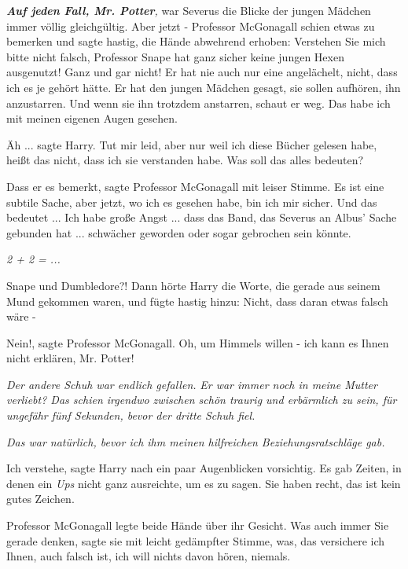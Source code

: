 \glqq{}\textbf{\emph{Auf jeden Fall, Mr. Potter}}\emph{,} war Severus die Blicke
der jungen Mädchen immer völlig gleichgültig. Aber jetzt -\grqq{} Professor
McGonagall schien etwas zu bemerken und sagte hastig, die Hände abwehrend
erhoben: \glqq{}Verstehen Sie mich bitte nicht falsch, Professor Snape hat ganz
sicher keine jungen Hexen ausgenutzt! Ganz und gar nicht! Er hat nie auch nur
eine angelächelt, nicht, dass ich es je gehört hätte. Er hat den jungen Mädchen
gesagt, sie sollen aufhören, ihn anzustarren. Und wenn sie ihn trotzdem
anstarren, schaut er weg. Das habe ich mit meinen eigenen Augen gesehen.\grqq{}

\glqq{}Äh ...\grqq{} sagte Harry. \glqq{}Tut mir leid, aber nur weil ich diese
Bücher gelesen habe, heißt das nicht, dass ich sie verstanden habe. Was soll das
alles bedeuten?\grqq{}

\glqq{}Dass er es bemerkt\grqq{}, sagte Professor McGonagall mit leiser Stimme.
\glqq{}Es ist eine subtile Sache, aber jetzt, wo ich es gesehen habe, bin ich mir
sicher. Und das bedeutet ... Ich habe große Angst ... dass das Band, das Severus
an Albus' Sache gebunden hat ... schwächer geworden oder sogar gebrochen sein
könnte.\grqq{}

\emph{2 + 2 = ...}

\glqq{}Snape und Dumbledore?!\grqq{} Dann hörte Harry die Worte, die gerade aus
seinem Mund gekommen waren, und fügte hastig hinzu: \glqq{}Nicht, dass daran
etwas falsch wäre -\grqq{}

\glqq{}Nein!\grqq{}, sagte Professor McGonagall. \glqq{}Oh, um Himmels willen -
ich kann es Ihnen nicht erklären, Mr. Potter!\grqq{}

\emph{Der andere Schuh war endlich gefallen.}
\emph{Er war immer noch in meine Mutter verliebt? Das schien irgendwo zwischen
schön traurig und erbärmlich zu sein, für ungefähr fünf Sekunden, bevor der
dritte Schuh fiel.}

\emph{Das war natürlich, bevor ich ihm meinen hilfreichen Beziehungsratschläge
gab.}

\glqq{}Ich verstehe\grqq{}, sagte Harry nach ein paar Augenblicken vorsichtig. Es
gab Zeiten, in denen ein \glqq{}\emph{Ups}\grqq{} nicht ganz ausreichte, um es zu
sagen. \glqq{}Sie haben recht, das ist kein gutes Zeichen.\grqq{}

Professor McGonagall legte beide Hände über ihr Gesicht. \glqq{}Was auch immer
Sie gerade denken\grqq{}, sagte sie mit leicht gedämpfter Stimme, \glqq{}was, das
versichere ich Ihnen, auch falsch ist, ich will nichts davon hören,
niemals.\grqq{}

